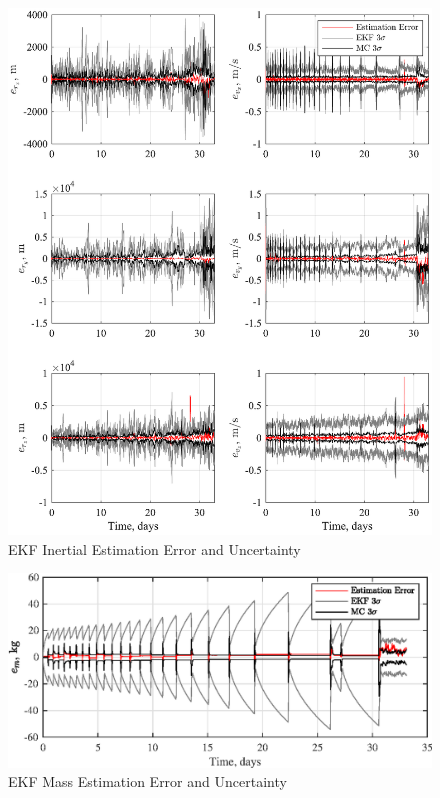 \documentclass[letterpaper, paper,11pt]{AAS}		%
\begin{document}
\begin{figure}
	\centering 
	\includegraphics{./../../figures/EKFPosVelError.eps}
	\caption{EKF Inertial Estimation Error and Uncertainty}
	\label{fig:EKFposvelerr}
\end{figure}

\begin{figure}
	\centering 
	\includegraphics{./../../figures/EKFMassError.eps}
	\caption{EKF Mass Estimation Error and Uncertainty}
	\label{fig:EKFmasserr}
\end{figure}
\end{document}
